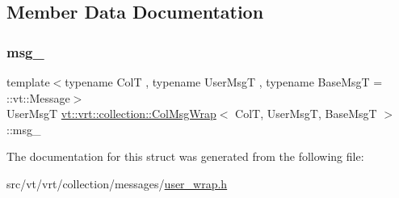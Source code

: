 \subsection{Member Data Documentation}
\mbox{\label{structvt_1_1vrt_1_1collection_1_1_col_msg_wrap_a781048274a322da08bc83a90adc8d37e}} 
\subsubsection{\texorpdfstring{msg\+\_\+}{msg\_}}
{\footnotesize\ttfamily template$<$typename ColT , typename User\+MsgT , typename Base\+MsgT  = \+::vt\+::\+Message$>$ \\
User\+MsgT \hyperlink{structvt_1_1vrt_1_1collection_1_1_col_msg_wrap}{vt\+::vrt\+::collection\+::\+Col\+Msg\+Wrap}$<$ ColT, User\+MsgT, Base\+MsgT $>$\+::msg\+\_\+\hspace{0.3cm}{\ttfamily [private]}}



The documentation for this struct was generated from the following file\+:\begin{DoxyCompactItemize}
\item 
src/vt/vrt/collection/messages/\hyperlink{user__wrap_8h}{user\+\_\+wrap.\+h}\end{DoxyCompactItemize}
